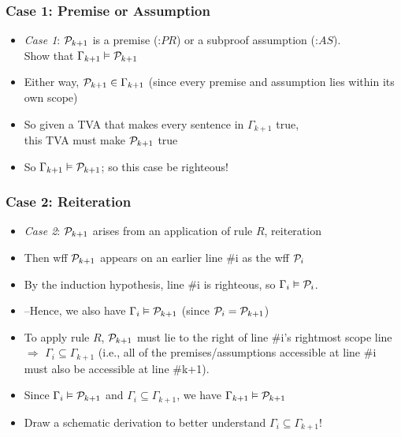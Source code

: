 \iffalse 

\begin{frame}
\frametitle{Case 1: Premise or Assumption}

\begin{itemize}[<+->]

\item \emph{Case 1}: $\mathcal{P}_{k +1}$ is a premise (:$PR$) or a subproof assumption (:$AS$). \\ Show that $\Gamma_{k+1} \vDash \mathcal{P}_{k+1}$

\item Either way, $\mathcal{P}_{k +1} \in \Gamma_{k+1}$ (since every premise and assumption lies within its own scope)

\item So given a TVA that makes every sentence in $\Gamma_{k+1}$ true, \\ this TVA must make $\mathcal{P}_{k +1} $ true 

\item So $\Gamma_{k+1} \vDash \mathcal{P}_{k+1}$; so this case be righteous! 

\end{itemize}
\end{frame}

\begin{frame}
\frametitle{Case 2: Reiteration}

\begin{itemize}[<+->]

\item \emph{Case 2}: $\mathcal{P}_{k +1}$ arises from an application of rule $R$, reiteration

\item Then wff $\mathcal{P}_{k +1}$ appears on an earlier line \#i as the wff $\mathcal{P}_{i}$

\item By the induction hypothesis, line \#i is righteous, so $\Gamma_{i} \vDash \mathcal{P}_{i}$. 

\item[] --Hence, we also have $\Gamma_{i} \vDash \mathcal{P}_{k+1}$ (since $\mathcal{P}_{i} = \mathcal{P}_{k+1}$)

\item To apply rule $R$, $\mathcal{P}_{k +1}$ must lie to the right of   line \#i's rightmost scope line $\Rightarrow$ $\Gamma_{i} \subseteq \Gamma_{k+1}$ (i.e., all of the premises/assumptions accessible at line \#i must also be accessible at line \#k+1). 

\item Since $\Gamma_{i} \vDash \mathcal{P}_{k+1}$ and $\Gamma_{i} \subseteq \Gamma_{k+1}$, we have  $\Gamma_{k+1} \vDash \mathcal{P}_{k+1}$

\item Draw a schematic derivation to better understand $\Gamma_{i} \subseteq \Gamma_{k+1}$!



\end{itemize}
\end{frame}

